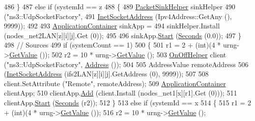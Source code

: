 \begin{DoxyCode}
486                     \}
487                   \textcolor{keywordflow}{else} \textcolor{keywordflow}{if} (systemId == z %
488                     \{
489                       \hyperlink{classns3_1_1PacketSinkHelper}{PacketSinkHelper} sinkHelper
490                         (\textcolor{stringliteral}{"ns3::UdpSocketFactory"},
491                         \hyperlink{classns3_1_1InetSocketAddress}{InetSocketAddress} (Ipv4Address::GetAny (), 9999));
492 
493                       \hyperlink{classns3_1_1ApplicationContainer}{ApplicationContainer} sinkApp =
494                         sinkHelper.Install (nodes\_net2LAN[z][i][j].Get (0));
495 
496                       sinkApp.\hyperlink{classns3_1_1ApplicationContainer_a8eff87926507020bbe3e1390358a54a7}{Start} (\hyperlink{group__timecivil_ga33c34b816f8ff6628e33d5c8e9713b9e}{Seconds} (0.0));
497                     \}
498                   \textcolor{comment}{// Sources}
499                   \textcolor{keywordflow}{if} (systemCount == 1)
500                     \{
501                       r1 = 2 + (int)(4 * urng->\hyperlink{classns3_1_1UniformRandomVariable_a03822d8c86ac51e9aa83bbc73041386b}{GetValue} ());
502                       r2 = 10 * urng->\hyperlink{classns3_1_1UniformRandomVariable_a03822d8c86ac51e9aa83bbc73041386b}{GetValue} ();
503                       \hyperlink{classns3_1_1OnOffHelper}{OnOffHelper} client (\textcolor{stringliteral}{"ns3::UdpSocketFactory"}, 
      \hyperlink{classns3_1_1Address}{Address} ());
504 
505                       AddressValue remoteAddress
506                         (\hyperlink{classns3_1_1InetSocketAddress}{InetSocketAddress} (ifs2LAN[z][i][j].GetAddress (0), 9999));
507 
508                       client.SetAttribute (\textcolor{stringliteral}{"Remote"}, remoteAddress);
509                       \hyperlink{classns3_1_1ApplicationContainer}{ApplicationContainer} clientApp;
510                       clientApp.\hyperlink{classns3_1_1ApplicationContainer_ad09ab1a1ad5849d518d5f4c262e38152}{Add} (client.Install (nodes\_net1[x][r1].Get (0)));
511                       clientApp.\hyperlink{classns3_1_1ApplicationContainer_a8eff87926507020bbe3e1390358a54a7}{Start} (\hyperlink{group__timecivil_ga33c34b816f8ff6628e33d5c8e9713b9e}{Seconds} (r2));
512                     \}
513                   \textcolor{keywordflow}{else} \textcolor{keywordflow}{if} (systemId == x %
514                     \{
515                       r1 = 2 + (int)(4 * urng->\hyperlink{classns3_1_1UniformRandomVariable_a03822d8c86ac51e9aa83bbc73041386b}{GetValue} ());
516                       r2 = 10 * urng->\hyperlink{classns3_1_1UniformRandomVariable_a03822d8c86ac51e9aa83bbc73041386b}{GetValue} ();

\end{DoxyCode}

